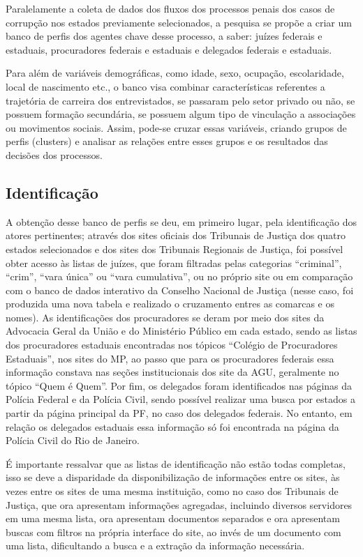 \documentclass[12pt]{article}
\begin{document}
Paralelamente a coleta de dados dos fluxos dos processos penais dos
casos de corrupção nos estados previamente selecionados, a pesquisa se
propõe a criar um banco de perfis dos agentes chave desse processo, a
saber: juízes federais e estaduais, procuradores federais e estaduais e
delegados federais e estaduais.

Para além de variáveis demográficas, como idade, sexo, ocupação,
escolaridade, local de nascimento etc., o banco visa combinar
características referentes a trajetória de carreira dos entrevistados,
se passaram pelo setor privado ou não, se possuem formação secundária,
se possuem algum tipo de vinculação a associações ou movimentos sociais.
Assim, pode-se cruzar essas variáveis, criando grupos de perfis
(clusters) e analisar as relações entre esses grupos e os resultados das
decisões dos processos.

\subsection{Identificação}\label{identificacao}

A obtenção desse banco de perfis se deu, em primeiro lugar, pela
identificação dos atores pertinentes; através dos sites oficiais dos
Tribunais de Justiça dos quatro estados selecionados e dos sites dos
Tribunais Regionais de Justiça, foi possível obter acesso às listas de
juízes, que foram filtradas pelas categorias ``criminal'', ``crim'',
``vara única'' ou ``vara cumulativa'', ou no próprio site ou em
comparação com o banco de dados interativo da Conselho Nacional de
Justiça (nesse caso, foi produzida uma nova tabela e realizado o
cruzamento entres as comarcas e os nomes). As identificações dos
procuradores se deram por meio dos sites da Advocacia Geral da União e
do Ministério Público em cada estado, sendo as listas dos procuradores
estaduais encontradas nos tópicos ``Colégio de Procuradores Estaduais'',
nos sites do MP, ao passo que para os procuradores federais essa
informação constava nas seções institucionais dos site da AGU,
geralmente no tópico ``Quem é Quem''. Por fim, os delegados foram
identificados nas páginas da Polícia Federal e da Polícia Civil, sendo
possível realizar uma busca por estados a partir da página principal da
PF, no caso dos delegados federais. No entanto, em relação os delegados
estaduais essa informação só foi encontrada na página da Polícia Civil
do Rio de Janeiro.

É importante ressalvar que as listas de identificação não estão todas
completas, isso se deve a disparidade da disponibilização de informações
entre os sites, às vezes entre os sites de uma mesma instituição, como
no caso dos Tribunais de Justiça, que ora apresentam informações
agregadas, incluindo diversos servidores em uma mesma lista, ora
apresentam documentos separados e ora apresentam buscas com filtros na
própria interface do site, ao invés de um documento com uma lista,
dificultando a busca e a extração da informação necessária.
\end{document}
